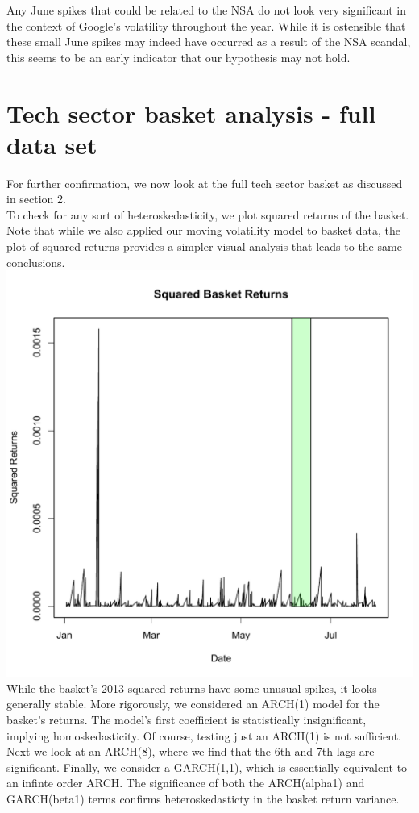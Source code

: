 \documentclass[11pt]{amsart}
\begin{document}
Any June spikes that could be related to the NSA do not look very significant in the context of Google's volatility throughout the year. While it is ostensible that these small June spikes may indeed have occurred as a result of the NSA scandal, this seems to be an early indicator that our hypothesis may not hold.

\newpage
\section{Tech sector basket analysis - full data set}
For further confirmation, we now look at the full tech sector basket as discussed in section 2. \\

To check for any sort of heteroskedasticity, we plot squared returns of the basket. Note that while we also
applied our moving volatility model to basket data, the plot of squared returns provides a simpler visual 
analysis that leads to the same conclusions.\\

\includegraphics[scale=0.4]{basket_sq_returns_11_25.pdf} \\

\newpage
While the basket's 2013 squared returns have some unusual spikes,  it looks generally stable. More rigorously, we considered an ARCH(1) model for the basket's returns. The model's first coefficient is statistically insignificant, implying homoskedasticity. Of course, testing just an ARCH(1) is not sufficient. Next we look at an ARCH(8), where we find that the 6th and 7th lags are significant. Finally, we consider a GARCH(1,1), which is essentially equivalent to an 
infinte order ARCH. The significance of both the ARCH(alpha1) and GARCH(beta1) terms confirms heteroskedasticty
in the basket return variance.  \\
\end{document}
